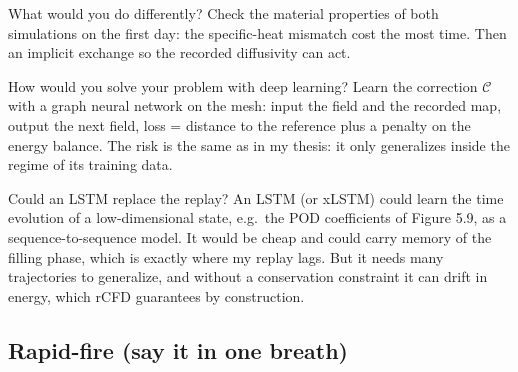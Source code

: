 \begin{qabox}[chair]{\asked What would you do differently?}
\ans Check the material properties of both simulations on the first day: the specific-heat mismatch
cost the most time. Then an implicit exchange so the recorded diffusivity can act.
\end{qabox}

\begin{qabox}[Klambauer]{\pred How would you solve your problem with deep learning?}
\ans Learn the correction $\mathcal{C}$ with a graph neural network on the mesh: input the field
and the recorded map, output the next field, loss = distance to the reference plus a penalty on the
energy balance. The risk is the same as in my thesis: it only generalizes inside the regime of its
training data.
\end{qabox}

\begin{qabox}[Hochreiter]{\pred Could an LSTM replace the replay?}
\ans An LSTM (or xLSTM) could learn the time evolution of a low-dimensional state, e.g.\ the POD
coefficients of Figure 5.9, as a sequence-to-sequence model. It would be cheap and could carry
memory of the filling phase, which is exactly where my replay lags. But it needs many trajectories
to generalize, and without a conservation constraint it can drift in energy, which rCFD
guarantees by construction.
\end{qabox}

\subsection{Rapid-fire (say it in one breath)}


